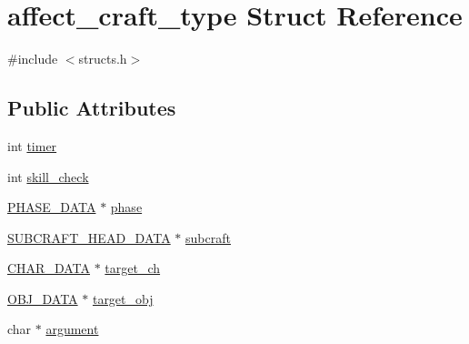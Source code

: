 \hypertarget{structaffect__craft__type}{\section{affect\-\_\-craft\-\_\-type Struct Reference}
\label{structaffect__craft__type}
}


{\ttfamily \#include $<$structs.\-h$>$}

\subsection*{Public Attributes}
\begin{DoxyCompactItemize}
\item 
int \hyperlink{structaffect__craft__type_a4e7d13094bc6a1ab21b1798ca2d26024}{timer}
\item 
int \hyperlink{structaffect__craft__type_afed3aadcdda4757cec543e78fcd888fa}{skill\-\_\-check}
\item 
\hyperlink{structs_8h_a946fd03f2da414ee020673d226fbae22}{P\-H\-A\-S\-E\-\_\-\-D\-A\-T\-A} $\ast$ \hyperlink{structaffect__craft__type_a5b6b383242ec944741b103e7fded20be}{phase}
\item 
\hyperlink{structs_8h_a495309683b6f6354b20a79327e7d77d9}{S\-U\-B\-C\-R\-A\-F\-T\-\_\-\-H\-E\-A\-D\-\_\-\-D\-A\-T\-A} $\ast$ \hyperlink{structaffect__craft__type_a1e65ee34eae30342f41ebf59af807cc2}{subcraft}
\item 
\hyperlink{structs_8h_af33ed1e66e8541a08bed257124f50f31}{C\-H\-A\-R\-\_\-\-D\-A\-T\-A} $\ast$ \hyperlink{structaffect__craft__type_ad3d71166632dffcb09cd945ee3ebdd89}{target\-\_\-ch}
\item 
\hyperlink{structs_8h_aaa59141dfc8c6ecdb6bfcf1537dd52d1}{O\-B\-J\-\_\-\-D\-A\-T\-A} $\ast$ \hyperlink{structaffect__craft__type_ae487885f5441a7b2d1064e4d0f1973ce}{target\-\_\-obj}
\item 
char $\ast$ \hyperlink{structaffect__craft__type_a2b2da639c4d0e96357113be658456a3e}{argument}
\end{DoxyCompactItemize}


